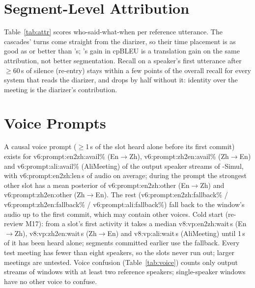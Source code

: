 \section{Segment-Level Attribution}
\label{app:attr}



Table~\ref{tab:attr} scores who-said-what-when per reference utterance. The cascades' turns come straight from the
diarizer, so their time placement is as good as or better than \sys{}'s; \sys{}'s gain in cpBLEU is a translation gain on
the same attribution, not better segmentation. Recall on a speaker's first utterance after $\ge$60\,s of silence (re-entry)
stays within a few points of the overall recall for every system that reads the diarizer, and drops by half without
it: identity over the meeting is the diarizer's contribution.

\section{Voice Prompts}
\label{app:voice}

A causal voice prompt ($\ge$1\,s of the slot heard alone before its first commit) exists for
\num{v6:prompt:en2zh:avail}\% (En$\rightarrow$Zh), \num{v6:prompt:zh2en:avail}\% (Zh$\rightarrow$En) and
\num{v6:prompt:ali:avail}\% (AliMeeting) of the output speaker streams of \sys{}-Simul, with
\num{v6:prompt:en2zh:len}\,s of audio on average; during the prompt the strongest other slot has a mean posterior of
\num{v6:prompt:en2zh:other} (En$\rightarrow$Zh) and \num{v6:prompt:zh2en:other} (Zh$\rightarrow$En). The rest
(\num{v6:prompt:en2zh:fallback}\% / \num{v6:prompt:zh2en:fallback}\% / \num{v6:prompt:ali:fallback}\%) fall back to the
window's audio up to the first commit, which may contain other voices. Cold start (re-review M17): from a slot's first activity it takes a median
\num{v8:vp:en2zh:wait}\,s (En$\rightarrow$Zh), \num{v8:vp:zh2en:wait}\,s (Zh$\rightarrow$En) and \num{v8:vp:ali:wait}\,s
(AliMeeting) until 1\,s of it has been heard alone; segments committed earlier use the fallback. Every test meeting has fewer than eight
speakers, so the slots never run out; larger meetings are untested. Voice confusion (Table~\ref{tab:voice}) counts only
output streams of windows with at least two reference speakers; single-speaker windows have no other voice to confuse.





